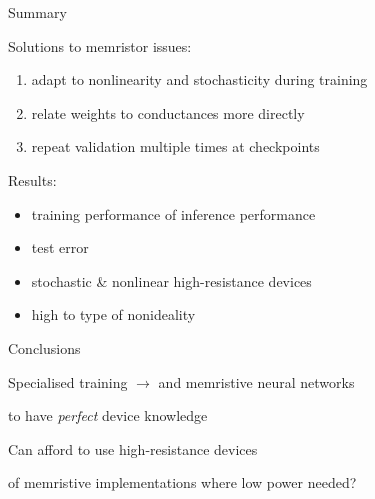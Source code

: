 \documentclass[
  aspectratio=169,
  hyperref={breaklinks=true, colorlinks, citecolor=blue, linkcolor=blue, urlcolor=blue},
]{beamer}
\begin{document}
\begin{frame}{Summary}
  \pause{}

  Solutions to memristor issues:
  \pause{}
  \begin{enumerate}[<+->]
    \item adapt to nonlinearity and stochasticity during training
    \item relate weights to conductances more directly
    \item repeat validation multiple times at checkpoints
  \end{enumerate}

  \bigskip

  \pause[\thebeamerpauses]

  Results:
  \pause{}
  \begin{itemize}[<+->]
    \item training performance  of inference performance
    \item {} test error
    \item {} stochastic \& nonlinear high-resistance devices
    \item high  to type of nonideality
  \end{itemize}
\end{frame}

\begin{frame}{Conclusions}
  \pause{}

  Specialised training $\rightarrow$  and  memristive neural networks

  \pause{}
  \bigskip

   to have \emph{perfect} device knowledge

  \pause{}
  \bigskip

  Can afford to use  high-resistance devices

  \pause{}
  \bigskip

   of memristive implementations where low power needed?

\end{frame}
\end{document}
